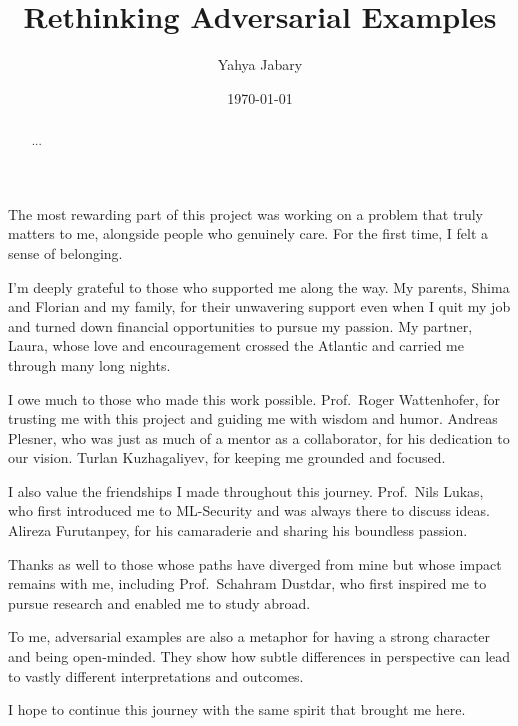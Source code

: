 \documentclass[a4paper, oneside]{discothesis}
\title{Rethinking Adversarial Examples}
\author{Yahya Jabary}
\institute{Computer Engineering and Networks Laboratory \\[2pt] ETH Zürich}
\date{\today}
\begin{document}
\frontmatter
\maketitle

\cleardoublepage

\begin{acknowledgements}
	The most rewarding part of this project was working on a problem that truly matters to me, alongside people who genuinely care. For the first time, I felt a sense of belonging.

	I'm deeply grateful to those who supported me along the way. My parents, Shima and Florian and my family, for their unwavering support \textendash{} even when I quit my job and turned down financial opportunities to pursue my passion. My partner, Laura, whose love and encouragement crossed the Atlantic and carried me through many long nights.
	
	I owe much to those who made this work possible. Prof.\ Roger Wattenhofer, for trusting me with this project and guiding me with wisdom and humor. Andreas Plesner, who was just as much of a mentor as a collaborator, for his dedication to our vision. Turlan Kuzhagaliyev, for keeping me grounded and focused.

	I also value the friendships I made throughout this journey. Prof.\ Nils Lukas, who first introduced me to ML-Security and was always there to discuss ideas. Alireza Furutanpey, for his camaraderie and sharing his boundless passion.

	Thanks as well to those whose paths have diverged from mine but whose impact remains with me, including Prof.\ Schahram Dustdar, who first inspired me to pursue research and enabled me to study abroad.

	To me, adversarial examples are also a metaphor for having a strong character and being open-minded. They show how subtle differences in perspective can lead to vastly different interpretations and outcomes.
	
	I hope to continue this journey with the same spirit that brought me here.
\end{acknowledgements}

\begin{abstract}
	...
\end{abstract}
\end{document}
